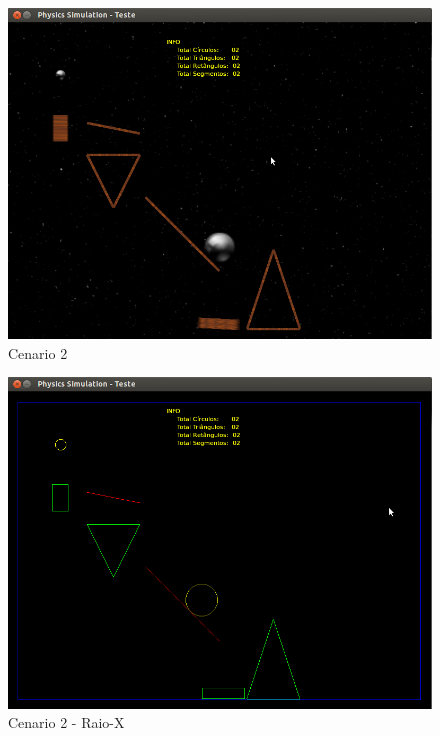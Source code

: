   \begin{figure}[H]
	  \centering
    \includegraphics[scale=0.4]{images/cenario-todos.png}
	  \caption{Cenario 2}
  \end{figure}

  \begin{figure}[H]
	  \centering
    \includegraphics[scale=0.4]{images/cenario-todosE.png}
	  \caption{Cenario 2 - Raio-X}
  \end{figure}

